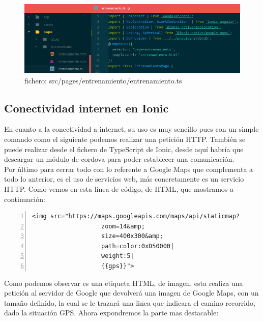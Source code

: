 \documentclass[a4paper, 11pt]{article}
\begin{document}
\begin{itemize}
                \begin{figure}[H]
                  \centering
                       \includegraphics[width=\textwidth]{entrenamientoTS}
                       \caption{fichero: src/pages/entrenamiento/entrenamiento.ts}
                       \label{f:entrenamientoTS}
                 \end{figure}

            \subsection{Conectividad internet en Ionic}

              En cuanto a la conectividad a internet, su uso es muy sencillo pues
              con un simple comando como el siguiente podemos realizar una petición
              HTTP. También se puede realizar desde el fichero de TypeScript de
              Ionic, desde aquí habría que descargar un módulo de cordova para
              poder establecer una comunicación.\\

              Por último para cerrar todo con lo referente a Google Maps
              que complementa a todo lo anterior, es el uso de servicios web,
              más concretamente es un servicio HTTP. Como vemos en esta línea de
              código, de HTML, que mostramos a continuación:\\

              \begin{lstlisting}[frame=single,numbers=left, numberstyle=\tiny, stepnumber=1, numbersep=-2pt]
    <img src="https://maps.googleapis.com/maps/api/staticmap?
                   zoom=14&amp;
                   size=400x300&amp;
                   path=color:0xD50000|
                   weight:5|
                   {{gps}}">
              \end{lstlisting}


              Como podemos observar es una etiqueta HTML, de imagen, esta realiza
              una petición al servidor de Google que devolverá una imagen de
              Google Maps, con un tamaño definido, la cual se le trazará una linea
              que indicara el camino recorrido, dado la situación GPS. Ahora
              expondremos la parte mas destacable:\\



\end{itemize}
\end{document}
